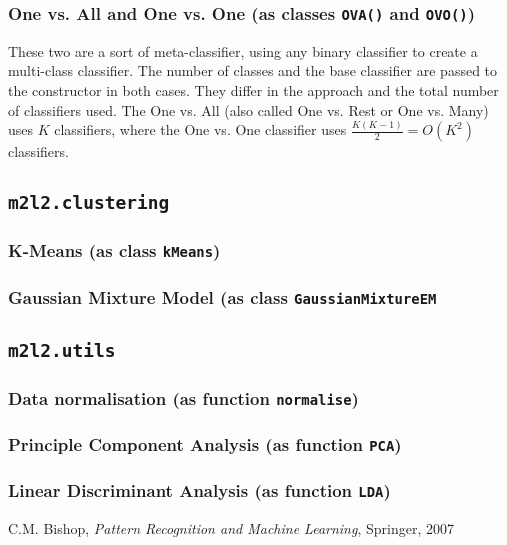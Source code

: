 \documentclass[a4paper, 12pt]{article}
\begin{document}
\subsubsection{One vs. All and One vs. One (as classes \texttt{OVA()} and \texttt{OVO()})}
These two are a sort of meta-classifier, using any binary classifier to create a multi-class classifier. The number of classes and the base classifier are passed to the constructor in both cases. They differ in the approach and the total number of classifiers used. The One vs. All (also called One vs. Rest or One vs. Many) uses $K$ classifiers, where the One vs. One classifier uses $\frac{K(K-1)}{2} = O(K^2)$ classifiers.

\subsection{\texttt{m2l2.clustering}}
\subsubsection{K-Means (as class \texttt{kMeans})}

\subsubsection{Gaussian Mixture Model (as class \texttt{GaussianMixtureEM}}

\subsection{\texttt{m2l2.utils}}
\subsubsection{Data normalisation (as function \texttt{normalise})}

\subsubsection{Principle Component Analysis (as function \texttt{PCA})}

\subsubsection{Linear Discriminant Analysis (as function \texttt{LDA})}

\begin{thebibliography}{9}
 C.M. Bishop, \emph{Pattern Recognition and Machine Learning}, Springer, 2007
\end{thebibliography}
\end{document}
